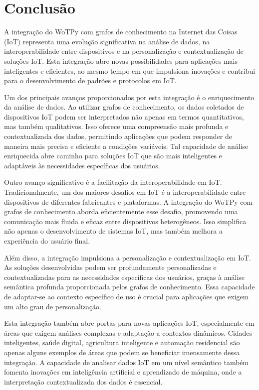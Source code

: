 \chapter{Conclusão}

A integração do WoTPy com grafos de conhecimento na Internet das Coisas (IoT) representa uma evolução significativa na análise de dados, na interoperabilidade entre dispositivos e na personalização e contextualização de soluções IoT. Esta integração abre novas possibilidades para aplicações mais inteligentes e eficientes, ao mesmo tempo em que impulsiona inovações e contribui para o desenvolvimento de padrões e protocolos em IoT.

Um dos principais avanços proporcionados por esta integração é o enriquecimento da análise de dados. Ao utilizar grafos de conhecimento, os dados coletados de dispositivos IoT podem ser interpretados não apenas em termos quantitativos, mas também qualitativos. Isso oferece uma compreensão mais profunda e contextualizada dos dados, permitindo aplicações que podem responder de maneira mais precisa e eficiente a condições variáveis. Tal capacidade de análise enriquecida abre caminho para soluções IoT que são mais inteligentes e adaptáveis às necessidades específicas dos usuários.

Outro avanço significativo é a facilitação da interoperabilidade em IoT. Tradicionalmente, um dos maiores desafios em IoT é a interoperabilidade entre dispositivos de diferentes fabricantes e plataformas. A integração do WoTPy com grafos de conhecimento aborda eficientemente esse desafio, promovendo uma comunicação mais fluida e eficaz entre dispositivos heterogêneos. Isso simplifica não apenas o desenvolvimento de sistemas IoT, mas também melhora a experiência do usuário final.

Além disso, a integração impulsiona a personalização e contextualização em IoT. As soluções desenvolvidas podem ser profundamente personalizadas e contextualizadas para as necessidades específicas dos usuários, graças à análise semântica profunda proporcionada pelos grafos de conhecimento. Essa capacidade de adaptar-se ao contexto específico de uso é crucial para aplicações que exigem um alto grau de personalização.

Esta integração também abre portas para novas aplicações IoT, especialmente em áreas que exigem análises complexas e adaptação a contextos dinâmicos. Cidades inteligentes, saúde digital, agricultura inteligente e automação residencial são apenas alguns exemplos de áreas que podem se beneficiar imensamente dessa integração. A capacidade de analisar dados IoT em um nível semântico também fomenta inovações em inteligência artificial e aprendizado de máquina, onde a interpretação contextualizada dos dados é essencial.

